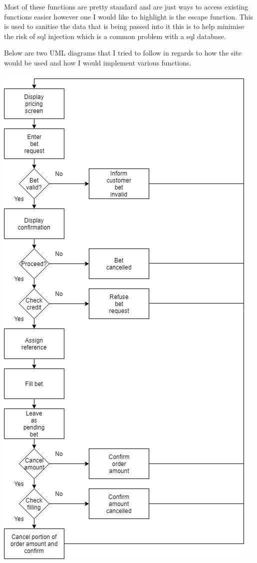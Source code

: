 Most of these functions are pretty standard and are just ways to access existing functions easier however one I would like to highlight is the escape function. This is used to sanitise the data that is being passed into it this is to help minimise the risk of sql injection which is a common problem with a sql database.

Below are two UML diagrams that I tried to follow in regards to how the site would be used and how I would implement various functions.

\includegraphics[width=\textwidth,height=\textheight,keepaspectratio]{img/FlowchartPlacingBet.png}

